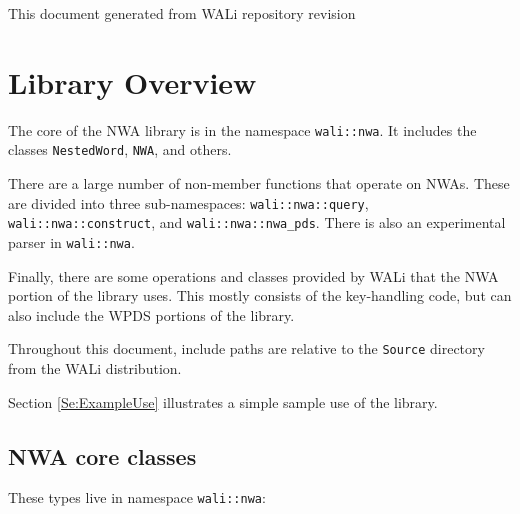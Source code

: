 {\noindent\footnotesize This document generated from WALi repository revision }

\clearpage
\tableofcontents
\clearpage

\section{Library Overview}
\label{Se:Nested Word Automata}

The core of the NWA library is in the namespace \texttt{wali::nwa}. It
includes the classes \texttt{NestedWord}, \texttt{NWA}, and others.

There are a large number of non-member functions that operate on NWAs. These
are divided into three sub-namespaces:
\texttt{wali::nwa::query}, \texttt{wali::nwa::construct}, and
\texttt{wali::nwa::nwa\_pds}. There is also an experimental parser in
\texttt{wali::nwa}.

Finally, there are some operations and classes provided by WALi that the NWA
portion of the library uses. This mostly consists of the key-handling code,
but can also include the WPDS portions of the library.

Throughout this document, include paths are relative to the \texttt{Source}
directory from the WALi distribution.

Section \ref{Se:ExampleUse} illustrates a simple sample use of the library.

\subsection{NWA core classes}

These types live in namespace \texttt{wali::nwa}:

